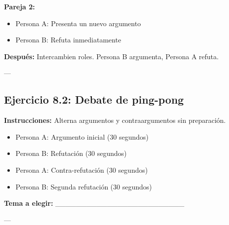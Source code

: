 \documentclass[a4paper,11pt]{article}
\begin{document}
\textbf{Pareja 2:}

\begin{itemize}

  \item Persona A: Presenta un nuevo argumento

  \item Persona B: Refuta inmediatamente

\end{itemize}

\vspace{0.2cm}

\textbf{Después:} Intercambien roles. Persona B argumenta, Persona A refuta.

\vspace{0.2cm}

---

\vspace{0.2cm}

\subsection{Ejercicio 8.2: Debate de ping-pong}

\vspace{0.2cm}

\textbf{Instrucciones:} Alterna argumentos y contraargumentos sin preparación.

\vspace{0.2cm}

\begin{itemize}

  \item Persona A: Argumento inicial (30 segundos)

  \item Persona B: Refutación (30 segundos)

  \item Persona A: Contra-refutación (30 segundos)

  \item Persona B: Segunda refutación (30 segundos)

\end{itemize}

\vspace{0.2cm}

\textbf{Tema a elegir:} _________________________

\vspace{0.2cm}

---

\vspace{0.2cm}
\end{document}
